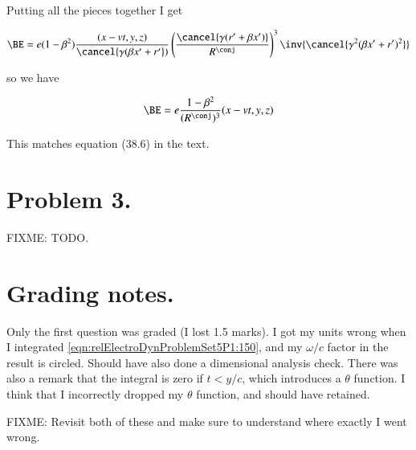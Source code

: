 Putting all the pieces together I get

\begin{align*}
\BE 
&= e (1 -\beta^2) \frac{(x - v t, y, z)}{\cancel{\gamma( \beta x' + r'})} \left( \frac{\cancel{\gamma( r' + \beta x')}}{R^\conj} \right)^3 \inv{\cancel{ \gamma^2 (\beta x' + r')^2 } } \\
\end{align*}

so we have

\begin{equation}\label{eqn:relElectroDynProblemSet5:1040}
\BE 
= e \frac{1 -\beta^2}{(R^\conj)^3} (x - v t, y, z) 
\end{equation}

This matches equation (38.6) in the text.  

\section{Problem 3.}

FIXME: TODO.

\section{Grading notes.}

Only the first question was graded (I lost 1.5 marks).  I got my units wrong when I integrated \ref{eqn:relElectroDynProblemSet5P1:150}, and my $\omega/c$ factor in the result is circled.  Should have also done a dimensional analysis check.  There was also a remark that the integral is zero if $t < y/c$, which introduces a $\theta$ function.  I think that I incorrectly dropped my $\theta$ function, and should have retained.

FIXME: Revisit both of these and make sure to understand where exactly I went wrong.

\EndArticle
